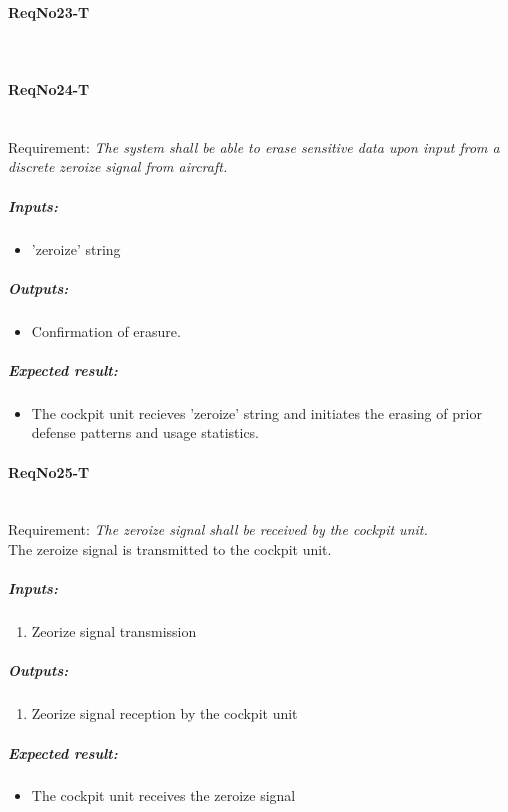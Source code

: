 \paragraph{ReqNo23-T}\mbox{}\\ %


\paragraph{ReqNo24-T}\mbox{}\\ %
Requirement: \textit{The system shall be able to erase sensitive data upon input from a discrete zeroize signal from aircraft.}\\
	\subparagraph{Inputs:}
	\begin{itemize}
	\item 'zeroize' string
	\end{itemize}
	\subparagraph{Outputs:}
	\begin{itemize}
	\item Confirmation of erasure.
	\end{itemize}
	\subparagraph{Expected result:}
	\begin{itemize}
	\item The cockpit unit recieves 'zeroize' string and initiates the erasing of prior defense patterns and usage statistics.
	\end{itemize}


\paragraph{ReqNo25-T}\mbox{}\\ %
Requirement: \textit{The zeroize signal shall be received by the cockpit unit.}\\

The zeroize signal is transmitted to the cockpit unit. 
\subparagraph{Inputs:}
	\begin{enumerate}
	\item Zeorize signal transmission
	\end{enumerate}
\subparagraph{Outputs:}
	\begin{enumerate}
	\item Zeorize signal reception by the cockpit unit
	\end{enumerate}
\subparagraph{Expected result:}
	\begin{itemize}
	\item The cockpit unit receives the zeroize signal 
	\end{itemize}

